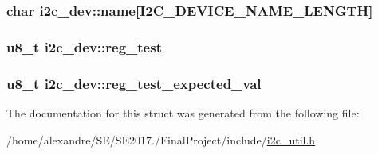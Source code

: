 \subsubsection[{\texorpdfstring{name}{name}}]{\setlength{\rightskip}{0pt plus 5cm}char i2c\+\_\+dev\+::name\mbox{[}{\bf I2\+C\+\_\+\+D\+E\+V\+I\+C\+E\+\_\+\+N\+A\+M\+E\+\_\+\+L\+E\+N\+G\+TH}\mbox{]}}\hypertarget{structi2c__dev_aa3e3ecd39bec0681b174122b4a5e91e5}{}\label{structi2c__dev_aa3e3ecd39bec0681b174122b4a5e91e5}
\subsubsection[{\texorpdfstring{reg\+\_\+test}{reg_test}}]{\setlength{\rightskip}{0pt plus 5cm}u8\+\_\+t i2c\+\_\+dev\+::reg\+\_\+test}\hypertarget{structi2c__dev_a20bd6a8e30216a5866cfc70fec9a3203}{}\label{structi2c__dev_a20bd6a8e30216a5866cfc70fec9a3203}
\subsubsection[{\texorpdfstring{reg\+\_\+test\+\_\+expected\+\_\+val}{reg_test_expected_val}}]{\setlength{\rightskip}{0pt plus 5cm}u8\+\_\+t i2c\+\_\+dev\+::reg\+\_\+test\+\_\+expected\+\_\+val}\hypertarget{structi2c__dev_a46e0fffcf23e10012b1f5afc774088e7}{}\label{structi2c__dev_a46e0fffcf23e10012b1f5afc774088e7}


The documentation for this struct was generated from the following file\+:\begin{DoxyCompactItemize}
\item 
/home/alexandre/\+S\+E/\+S\+E2017./\+Final\+Project/include/\hyperlink{i2c__util_8h}{i2c\+\_\+util.\+h}\end{DoxyCompactItemize}
